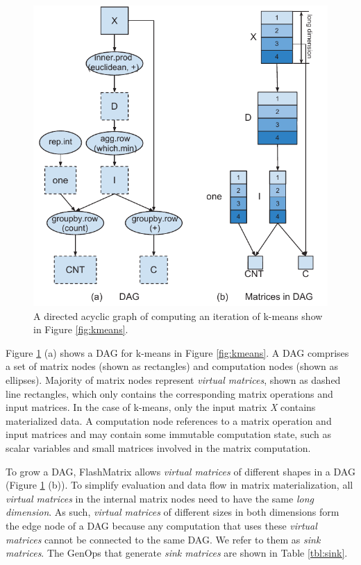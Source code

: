 \begin{figure}
	\centering
	\includegraphics[scale=0.7]{FlashMatrix_figs/KMeans.pdf}
	\caption{A directed acyclic graph of computing an iteration of k-means
	show in Figure \ref{fig:kmeans}.}
	\label{fig:DAG}
\end{figure}

Figure \ref{fig:DAG} (a) shows a DAG for k-means in Figure
\ref{fig:kmeans}. A DAG comprises a set of matrix nodes (shown as rectangles)
and computation nodes (shown as ellipses). Majority of matrix nodes represent
\textit{virtual matrices}, shown as dashed line rectangles, which only contains
the corresponding matrix operations and input matrices. In the case of k-means,
only the input matrix \textit{X} contains materialized data.
A computation node references to a matrix operation and input matrices and
may contain some immutable computation state, such as scalar variables and
small matrices involved in the matrix computation. 

To grow a DAG, FlashMatrix allows \textit{virtual matrices} of different shapes
in a DAG (Figure \ref{fig:DAG} (b)). To simplify evaluation and data flow in
matrix materialization, all \textit{virtual matrices} in the internal matrix
nodes need to have the same \textit{long dimension}. As such, \textit{virtual
matrices} of different sizes in both dimensions form the edge node of a DAG because
any computation that uses these \textit{virtual matrices} cannot be connected
to the same DAG.  We refer to them as \textit{sink matrices}. The GenOps that
generate \textit{sink matrices} are shown in Table \ref{tbl:sink}.

